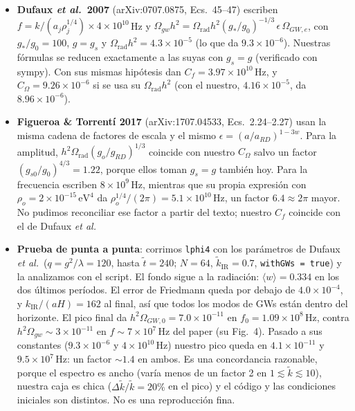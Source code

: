 \documentclass[11pt]{article}
\begin{document}
            \begin{itemize}
                \item \textbf{Dufaux \emph{et al.}\ 2007} (arXiv:0707.0875, Ecs.~45--47) escriben $f = k/(a_j\rho_j^{1/4}) \times 4 \times 10^{10}$\,Hz y $\Omega_{gw}h^2 = \Omega_{\text{rad}}h^2 (g_*/g_0)^{-1/3} \, \epsilon \, \Omega_{GW,e}$, con $g_*/g_0 = 100$, $g = g_s$ y $\Omega_{\text{rad}}h^2 = 4.3 \times 10^{-5}$ (lo que da $9.3 \times 10^{-6}$). Nuestras fórmulas se reducen exactamente a las suyas con $g_s = g$ (verificado con sympy). Con sus mismas hipótesis dan $C_f = 3.97 \times 10^{10}$\,Hz, y $C_\Omega = 9.26 \times 10^{-6}$ si se usa su $\Omega_{\text{rad}}h^2$ (con el nuestro, $4.16 \times 10^{-5}$, da $8.96 \times 10^{-6}$).
                \item \textbf{Figueroa \& Torrentí 2017} (arXiv:1707.04533, Ecs.~2.24--2.27) usan la misma cadena de factores de escala y el mismo $\epsilon = (a/a_{RD})^{1-3w}$. Para la amplitud, $h^2\Omega_{\text{rad}}(g_o/g_{RD})^{1/3}$ coincide con nuestro $C_\Omega$ salvo un factor $(g_{s0}/g_0)^{4/3} = 1.22$, porque ellos toman $g_s = g$ también hoy. Para la frecuencia escriben $8 \times 10^9$\,Hz, mientras que su propia expresión con $\rho_o = 2 \times 10^{-15}\,\text{eV}^4$ da $\rho_o^{1/4}/(2\pi) = 5.1 \times 10^{10}$\,Hz, un factor $6.4 \approx 2\pi$ mayor. No pudimos reconciliar ese factor a partir del texto; nuestro $C_f$ coincide con el de Dufaux \emph{et al.}
                \item \textbf{Prueba de punta a punta}: corrimos \texttt{lphi4} con los parámetros de Dufaux \emph{et al.}\ ($q = g^2/\lambda = 120$, hasta $\tilde t = 240$; $N = 64$, $\tilde k_{\text{IR}} = 0.7$, \texttt{withGWs = true}) y la analizamos con el script. El fondo sigue a la radiación: $\langle w\rangle = 0.334$ en los dos últimos períodos. El error de Friedmann queda por debajo de $4.0 \times 10^{-4}$, y $k_{\text{IR}}/(aH) = 162$ al final, así que todos los modos de GWs están dentro del horizonte. El pico final da $h^2\Omega_{GW,0} = 7.0 \times 10^{-11}$ en $f_0 = 1.09 \times 10^8$\,Hz, contra $h^2\Omega_{gw} \sim 3 \times 10^{-11}$ en $f \sim 7 \times 10^7$\,Hz del paper (su Fig.~4). Pasado a sus constantes ($9.3 \times 10^{-6}$ y $4 \times 10^{10}$\,Hz) nuestro pico queda en $4.1 \times 10^{-11}$ y $9.5 \times 10^7$\,Hz: un factor $\sim 1.4$ en ambos. Es una concordancia razonable, porque el espectro es ancho (varía menos de un factor 2 en $1 \lesssim \tilde k \lesssim 10$), nuestra caja es chica ($\Delta \tilde k / \tilde k = 20\%$ en el pico) y el código y las condiciones iniciales son distintos. No es una reproducción fina.
            \end{itemize}
\end{document}
